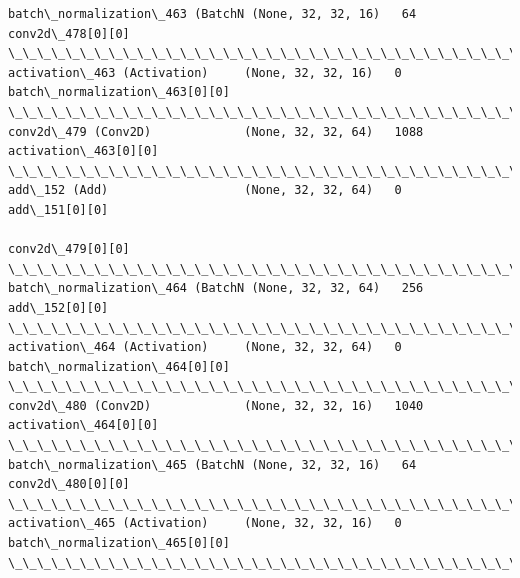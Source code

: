 \documentclass[11pt]{article}
\begin{document}
\begin{Verbatim}[commandchars=\\\{\}]
batch\_normalization\_463 (BatchN (None, 32, 32, 16)   64          conv2d\_478[0][0]                 
\_\_\_\_\_\_\_\_\_\_\_\_\_\_\_\_\_\_\_\_\_\_\_\_\_\_\_\_\_\_\_\_\_\_\_\_\_\_\_\_\_\_\_\_\_\_\_\_\_\_\_\_\_\_\_\_\_\_\_\_\_\_\_\_\_\_\_\_\_\_\_\_\_\_\_\_\_\_\_\_\_\_\_\_\_\_\_\_\_\_\_\_\_\_\_\_\_\_
activation\_463 (Activation)     (None, 32, 32, 16)   0           batch\_normalization\_463[0][0]    
\_\_\_\_\_\_\_\_\_\_\_\_\_\_\_\_\_\_\_\_\_\_\_\_\_\_\_\_\_\_\_\_\_\_\_\_\_\_\_\_\_\_\_\_\_\_\_\_\_\_\_\_\_\_\_\_\_\_\_\_\_\_\_\_\_\_\_\_\_\_\_\_\_\_\_\_\_\_\_\_\_\_\_\_\_\_\_\_\_\_\_\_\_\_\_\_\_\_
conv2d\_479 (Conv2D)             (None, 32, 32, 64)   1088        activation\_463[0][0]             
\_\_\_\_\_\_\_\_\_\_\_\_\_\_\_\_\_\_\_\_\_\_\_\_\_\_\_\_\_\_\_\_\_\_\_\_\_\_\_\_\_\_\_\_\_\_\_\_\_\_\_\_\_\_\_\_\_\_\_\_\_\_\_\_\_\_\_\_\_\_\_\_\_\_\_\_\_\_\_\_\_\_\_\_\_\_\_\_\_\_\_\_\_\_\_\_\_\_
add\_152 (Add)                   (None, 32, 32, 64)   0           add\_151[0][0]                    
                                                                 conv2d\_479[0][0]                 
\_\_\_\_\_\_\_\_\_\_\_\_\_\_\_\_\_\_\_\_\_\_\_\_\_\_\_\_\_\_\_\_\_\_\_\_\_\_\_\_\_\_\_\_\_\_\_\_\_\_\_\_\_\_\_\_\_\_\_\_\_\_\_\_\_\_\_\_\_\_\_\_\_\_\_\_\_\_\_\_\_\_\_\_\_\_\_\_\_\_\_\_\_\_\_\_\_\_
batch\_normalization\_464 (BatchN (None, 32, 32, 64)   256         add\_152[0][0]                    
\_\_\_\_\_\_\_\_\_\_\_\_\_\_\_\_\_\_\_\_\_\_\_\_\_\_\_\_\_\_\_\_\_\_\_\_\_\_\_\_\_\_\_\_\_\_\_\_\_\_\_\_\_\_\_\_\_\_\_\_\_\_\_\_\_\_\_\_\_\_\_\_\_\_\_\_\_\_\_\_\_\_\_\_\_\_\_\_\_\_\_\_\_\_\_\_\_\_
activation\_464 (Activation)     (None, 32, 32, 64)   0           batch\_normalization\_464[0][0]    
\_\_\_\_\_\_\_\_\_\_\_\_\_\_\_\_\_\_\_\_\_\_\_\_\_\_\_\_\_\_\_\_\_\_\_\_\_\_\_\_\_\_\_\_\_\_\_\_\_\_\_\_\_\_\_\_\_\_\_\_\_\_\_\_\_\_\_\_\_\_\_\_\_\_\_\_\_\_\_\_\_\_\_\_\_\_\_\_\_\_\_\_\_\_\_\_\_\_
conv2d\_480 (Conv2D)             (None, 32, 32, 16)   1040        activation\_464[0][0]             
\_\_\_\_\_\_\_\_\_\_\_\_\_\_\_\_\_\_\_\_\_\_\_\_\_\_\_\_\_\_\_\_\_\_\_\_\_\_\_\_\_\_\_\_\_\_\_\_\_\_\_\_\_\_\_\_\_\_\_\_\_\_\_\_\_\_\_\_\_\_\_\_\_\_\_\_\_\_\_\_\_\_\_\_\_\_\_\_\_\_\_\_\_\_\_\_\_\_
batch\_normalization\_465 (BatchN (None, 32, 32, 16)   64          conv2d\_480[0][0]                 
\_\_\_\_\_\_\_\_\_\_\_\_\_\_\_\_\_\_\_\_\_\_\_\_\_\_\_\_\_\_\_\_\_\_\_\_\_\_\_\_\_\_\_\_\_\_\_\_\_\_\_\_\_\_\_\_\_\_\_\_\_\_\_\_\_\_\_\_\_\_\_\_\_\_\_\_\_\_\_\_\_\_\_\_\_\_\_\_\_\_\_\_\_\_\_\_\_\_
activation\_465 (Activation)     (None, 32, 32, 16)   0           batch\_normalization\_465[0][0]    
\_\_\_\_\_\_\_\_\_\_\_\_\_\_\_\_\_\_\_\_\_\_\_\_\_\_\_\_\_\_\_\_\_\_\_\_\_\_\_\_\_\_\_\_\_\_\_\_\_\_\_\_\_\_\_\_\_\_\_\_\_\_\_\_\_\_\_\_\_\_\_\_\_\_\_\_\_\_\_\_\_\_\_\_\_\_\_\_\_\_\_\_\_\_\_\_\_\_

\end{Verbatim}
\end{document}

